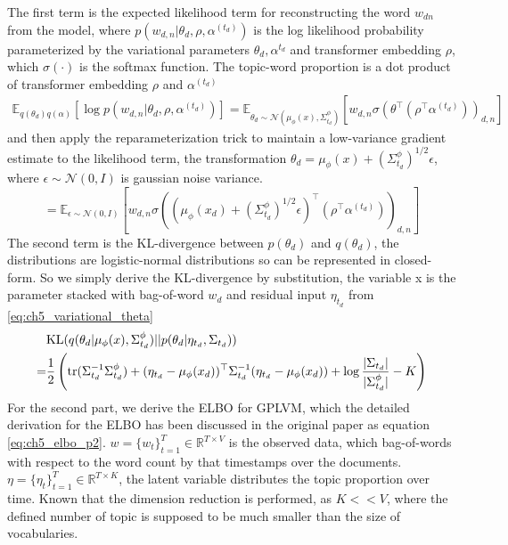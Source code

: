 The first term is the expected likelihood term for reconstructing the word $ w_{dn} $ from the model, where $ p(w_{d,n}|\theta_d, \rho,\alpha^{(t_d)}) $ is the log likelihood probability parameterized by the variational parameters $ \theta_d, \alpha^{t_d} $ and transformer embedding $ \rho $, which $ \sigma(\cdot) $ is the softmax function. The topic-word proportion is a dot product of transformer embedding $ \rho $ and $ \alpha^{(t_d)} $
\begin{align}
\mathbb{E}_{q(\theta_d)q(\alpha)}[\log p(w_{d,n}|\theta_d,\rho,\alpha^{(t_d)})]=\mathbb{E}_{\theta_d\sim\mathcal{N}(\mu_{\phi}(x),\Sigma^{\phi}_{t_d})}[w_{d,n}\sigma(\theta^\top(\rho^\top\alpha^{(t_d)}))_{d,n}]
\end{align}
and then apply the reparameterization trick to maintain a low-variance gradient estimate to the likelihood term, the transformation $ \theta_d=\mu_{\phi}(x)+(\Sigma^{\phi}_{t_d})^{1/2}\epsilon $, where $ \epsilon\sim\mathcal{N}(0,I) $ is gaussian noise variance.
\begin{equation}\label{eq:ch5_reconstruction}
=\mathbb{E}_{\epsilon\sim\mathcal{N}(0,I)}\left[w_{d,n}\sigma((\mu_{\phi}(x_d)+(\Sigma^{\phi}_{t_d})^{1/2}\epsilon)^\top(\rho^\top\alpha^{(t_d)}))_{d,n}\right]
\end{equation}
The second term is the KL-divergence between $ p(\theta_d) $ and $ q(\theta_d) $, the distributions are logistic-normal distributions so can be represented in closed-form. So we simply derive the KL-divergence by substitution,
the variable x is the parameter stacked with bag-of-word $ w_d $ and residual input $ \eta_{t_d} $ from \ref{eq:ch5_variational_theta}
\begin{align}\label{eq:ch5_kl_theta}
&\text{KL}(q(\theta_d|\mu_{\phi}(x),\Sigma^{\phi}_{t_d})||p(\theta_d|\eta_{t_d},\Sigma_{t_d}))\notag\\
=&\frac{1}{2}\left(\text{tr}(\Sigma_{t_d}^{-1}\Sigma_{t_d}^{\phi})+(\eta_{t_d}-\mu_{\phi}(x_d))^\top\Sigma_{t_d}^{-1}(\eta_{t_d}-\mu_{\phi}(x_d))+\log\frac{|\Sigma_{t_d}|}{|\Sigma^{\phi}_{t_d}|}-K\right)
\end{align}
For the second part, we derive the ELBO for GPLVM, which the detailed derivation for the ELBO has been discussed in the original paper \cite{titsias_bayesian_nodate} as equation \ref{eq:ch5_elbo_p2}. $ w=\{w_t\}^{T}_{t=1}\in\mathbb{R}^{T\times V} $ is the observed data, which bag-of-words with respect to the word count by that timestamps over the documents. $ \eta=\{\eta_t\}^{T}_{t=1}\in\mathbb{R}^{T\times K} $, the latent variable distributes the topic proportion over time. Known that the dimension reduction is performed, as $ K<<V $, where the defined number of topic is supposed to be much smaller than the size of vocabularies.
